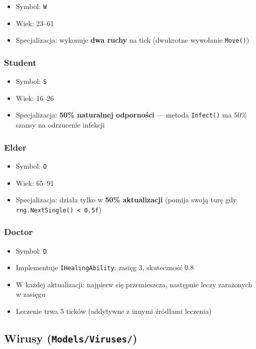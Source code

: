 \documentclass[a4paper,12pt]{article}
\begin{document}
\begin{itemize}
    \item Symbol: \texttt{W}
    \item Wiek: 23--61
    \item Specjalizacja: wykonuje \textbf{dwa ruchy} na tick (dwukrotne wywołanie \texttt{Move()})
\end{itemize}

\subsubsection{Student}

\begin{itemize}
    \item Symbol: \texttt{S}
    \item Wiek: 16--26
    \item Specjalizacja: \textbf{50\% naturalnej odporności} --- metoda \texttt{Infect()} ma 50\% szansy
          na odrzucenie infekcji
\end{itemize}

\subsubsection{Elder}

\begin{itemize}
    \item Symbol: \texttt{O}
    \item Wiek: 65--91
    \item Specjalizacja: działa tylko w \textbf{50\% aktualizacji} (pomija swoją turę gdy
          \texttt{rng.NextSingle() < 0.5f})
\end{itemize}

\subsubsection{Doctor}

\begin{itemize}
    \item Symbol: \texttt{D}
    \item Implementuje \texttt{IHealingAbility}: zasięg 3, skuteczność 0.8
    \item W każdej aktualizacji: najpierw się przemieszcza, następnie leczy zarażonych w zasięgu
    \item Leczenie trwa 5 ticków (addytywne z innymi źródłami leczenia)
\end{itemize}

\subsection{Wirusy (\texttt{Models/Viruses/})}
\end{document}
